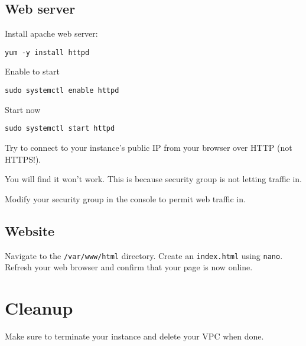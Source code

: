 \subsection{Web server}\label{web-server}

Install apache web server:

\begin{verbatim}
yum -y install httpd
\end{verbatim}

Enable to start

\begin{verbatim}
sudo systemctl enable httpd
\end{verbatim}

Start now

\begin{verbatim}
sudo systemctl start httpd
\end{verbatim}

Try to connect to your instance's public IP from your browser over HTTP
(not HTTPS!).

You will find it won't work. This is because security group is not
letting traffic in.

Modify your security group in the console to permit web traffic in. 


\subsection{Website}\label{website}

Navigate to the \texttt{/var/www/html} directory.
Create an \texttt{index.html} using \texttt{nano}.
Refresh your web browser and confirm that your page is now online. 


\section{Cleanup}

Make sure to terminate your instance and delete your VPC when done.
